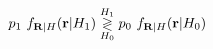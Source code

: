 \documentclass[preview]{standalone}
\begin{document}
\begin{align*}
\special{dvisvgm:raw <g id='unique000'>}p_1\ f_{\mathbf R|H}(\mathbf r|H_1)\underset{H_0}{\overset{H_1}{\gtrless}}p_0\ f_{\mathbf R|H}(\mathbf r|H_0)\special{dvisvgm:raw </g>}
\end{align*}
\end{document}
